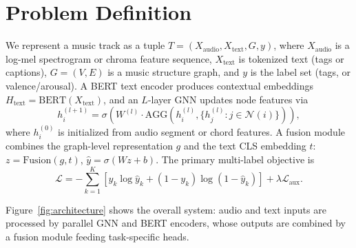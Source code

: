 \documentclass[conference]{IEEEtran}
\begin{document}
\section{Problem Definition}

We represent a music track as a tuple $T = (X_{\text{audio}},
X_{\text{text}}, G, y)$, where $X_{\text{audio}}$ is a log-mel
spectrogram or chroma feature sequence, $X_{\text{text}}$ is tokenized
text (tags or captions), $G = (V, E)$ is a music structure graph, and
$y$ is the label set (tags, or valence/arousal). A BERT text encoder
produces contextual embeddings $H_{\text{text}} = \text{BERT}(X_{\text{text}})$,
and an $L$-layer GNN updates node features via
\begin{equation}
h_i^{(l+1)} = \sigma\!\left(W^{(l)} \cdot \text{AGG}\left(h_i^{(l)}, \{h_j^{(l)} : j \in \mathcal{N}(i)\}\right)\right),
\end{equation}
where $h_i^{(0)}$ is initialized from audio segment or chord features.
A fusion module combines the graph-level representation $g$ and the
text CLS embedding $t$: $z = \text{Fusion}(g, t)$, $\hat{y} =
\sigma(Wz + b)$. The primary multi-label objective is
\begin{equation}
\mathcal{L} = -\sum_{k=1}^{K}\left[y_k \log \hat{y}_k + (1-y_k)\log(1-\hat{y}_k)\right] + \lambda \mathcal{L}_{\text{aux}}.
\end{equation}

Figure~\ref{fig:architecture} shows the overall system: audio and text
inputs are processed by parallel GNN and BERT encoders, whose outputs
are combined by a fusion module feeding task-specific heads.
\end{document}
